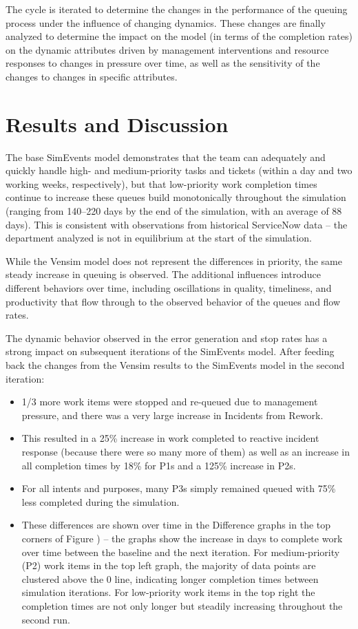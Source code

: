 \documentclass[conference]{IEEEtran}
\begin{document}
The cycle is iterated to determine the changes in the performance of the queuing process under the influence of changing dynamics. These changes are finally analyzed to determine the impact on the model (in terms of the completion rates) on the dynamic attributes driven by management interventions and resource responses to changes in pressure over time, as well as the sensitivity of the changes to changes in specific attributes.

\section{Results and Discussion}
\label{sec:results}

The base SimEvents model demonstrates that the team can adequately and quickly handle high- and medium-priority tasks and tickets (within a day and two working weeks, respectively), but that low-priority work completion times continue to increase these queues build monotonically throughout the simulation (ranging from 140--220 days by the end of the simulation, with an average of 88 days). This is consistent with observations from historical ServiceNow data -- the department analyzed is not in equilibrium at the start of the simulation.

While the Vensim model does not represent the differences in priority, the same steady increase in queuing is observed. The additional influences introduce different behaviors over time, including oscillations in quality, timeliness, and productivity that flow through to the observed behavior of the queues and flow rates. 

The dynamic behavior observed in the error generation and stop rates has a strong impact on subsequent iterations of the SimEvents model. After feeding back the changes from the Vensim results to the SimEvents model in the second iteration: 

\begin{itemize}
\item 1/3 more work items were stopped and re-queued due to management pressure, and there was a very large increase in Incidents from Rework. 
\item This resulted in a 25\% increase in work completed to reactive incident response (because there were so many more of them) as well as an increase in all completion times by 18\% for P1s and a 125\% increase in P2s.
\item For all intents and purposes, many P3s simply remained queued with 75\% less completed during the simulation. 
\item These differences are shown over time in the Difference graphs in the top corners of Figure ) -- the graphs show the increase in days to complete work over time between the baseline and the next iteration. For medium-priority (P2) work items in the top left graph, the majority of data points are clustered above the 0 line, indicating longer completion times between simulation iterations. For low-priority  work items in the top right the completion times are not only longer but steadily increasing throughout the second run.
\end{itemize}
\end{document}
